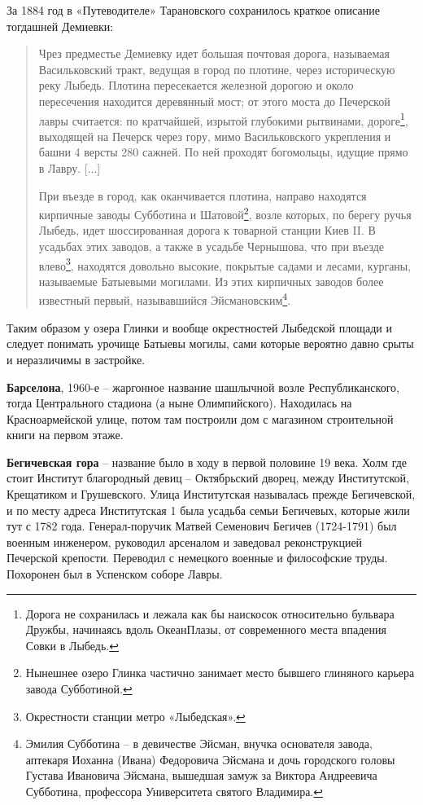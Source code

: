 За 1884 год в «Путеводителе» Тарановского сохранилось краткое описание тогдашней Демиевки:

\begin{quotation}
Чрез предместье Демиевку идет большая почтовая дорога, называемая Васильковский тракт, ведущая в город по плотине, через историческую реку Лыбедь. Плотина пересекается железной дорогою и около пересечения находится деревянный мост; от этого моста до Печерской лавры считается: по кратчайшей, изрытой глубокими рытвинами, дороге\footnote{Дорога не сохранилась и лежала как бы наискосок относительно бульвара Дружбы, начинаясь вдоль ОкеанПлазы, от современного места впадения Совки в Лыбедь.}, выходящей на Печерск через гору, мимо Васильковского укрепления и башни 4 версты 280 сажней. По ней проходят богомольцы, идущие прямо в Лавру. [...]

При въезде в город, как оканчивается плотина, направо находятся кирпичные заводы Субботина и Шатовой\footnote{Нынешнее озеро Глинка частично занимает место бывшего глиняного карьера завода Субботиной.}, возле которых, по берегу ручья Лыбедь, идет шоссированная дорога к товарной станции Киев II. В усадьбах этих заводов, а также в усадьбе Чернышова, что при въезде влево\footnote{Окрестности станции метро «Лыбедская».}, находятся довольно высокие, покрытые садами и лесами, курганы, называемые Батыевыми могилами. Из этих кирпичных заводов более известный первый, называвшийся Эйсмановским\footnote{Эмилия Субботина – в девичестве Эйсман, внучка основателя завода, аптекаря Иоханна (Ивана) Федоровича Эйсмана и дочь городского головы Густава Ивановича Эйсмана, вышедшая замуж за Виктора Андреевича Субботина, профессора Университета святого Владимира.}. 
\end{quotation}

Таким образом у озера Глинки и вообще окрестностей Лыбедской площади и следует понимать урочище Батыевы могилы, сами которые вероятно давно срыты и неразличимы в застройке.\\


\medskip


\textbf{Барселона}, 1960-е – жаргонное название шашлычной возле Республиканского, тогда Центрального стадиона (а ныне Олимпийского). Находилась на Красноармейской улице, потом там построили дом с магазином строительной книги на первом этаже.\\


\medskip


\textbf{Бегичевская гора} – название было в ходу в первой половине 19 века. Холм где стоит Институт благородный девиц – Октябрьский дворец, между Институтской, Крещатиком и Грушевского. Улица Институтская называлась прежде Бегичевской, и по месту адреса Институтская 1 была усадьба семьи Бегичевых, которые жили тут с 1782 года. Генерал-поручик Матвей Семенович Бегичев (1724-1791) был военным инженером, руководил арсеналом и заведовал реконструкцией Печерской крепости. Переводил с немецкого военные и философские труды. Похоронен был в Успенском соборе Лавры.

